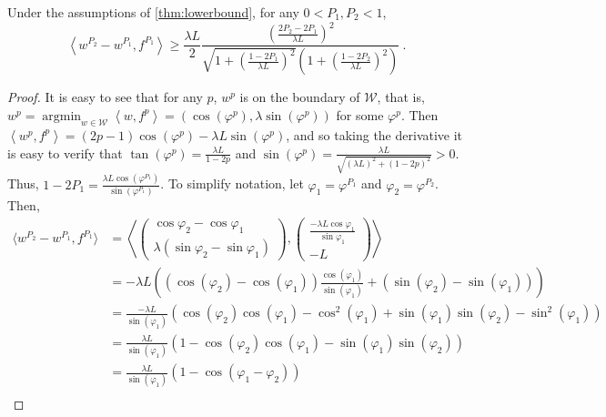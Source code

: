 \documentclass[english]{article}
\newcommand{\cW}{\mathcal{W}}
\newcommand{\inner}[1]{\left\langle#1\right\rangle}
\DeclareMathOperator*{\argmin}{argmin}
\begin{document}
\begin{lemma} Under the assumptions of \cref{thm:lowerbound}, for any $0<P_1,P_2<1$,
	\label{lem:P2P1loss}
	\[
	\inner{w^{P_2} - w^{P_1}, f^{P_1}} \ge \frac{\lambda L}{2} \frac{\left( \frac{2P_2 - 2P_1}{\lambda L} \right)^2}{\sqrt{1+\left( \frac{1-2P_1}{\lambda L}\right)^2 } \left(1+\left( \frac{1-2P_2}{\lambda L}\right)^2 \right)}~.
	\]
\end{lemma}
\begin{proof}
	It is easy to see that for any $p$, $w^p$ is on the boundary of $\cW$, that is, $w^p = \argmin_{w\in\cW} \inner{ w, f^p } = (\cos (\varphi^p), \lambda\sin (\varphi^p))$ for some $\varphi^p$. 
	Then $\inner{w^p,f^p}= (2p-1) \cos (\varphi^p) - \lambda L \sin (\varphi^p)$, and so taking the derivative it is easy to verify that $\tan(\varphi^p) = \frac{\lambda L}{1-2p}$ and $\sin(\varphi^p) = \frac{\lambda L}{\sqrt{(\lambda L)^2+(1-2p)^2}} >0$. 
	Thus, $1-2P_1 = \frac{\lambda L\cos (\varphi^{P_1})}{\sin (\varphi^{P_1})}$. To simplify notation, let $\varphi_1=\varphi^{P_1}$ and $\varphi_2=\varphi^{P_2}$. Then,
	\allowdisplaybreaks
	\begin{align}
	\langle w^{P_2} - w^{P_1}, f^{P_1} \rangle & = \left\langle \left(
	\begin{array}{c}
	\cos \varphi_{2} - \cos \varphi_{1} \\
	\lambda \left(\sin \varphi_{2} - \sin \varphi_{1} \right) 
	\end{array}
	\right),  \left( 
	\begin{array}{c}
	\frac{-\lambda L\cos \varphi_{1}}{\sin \varphi_{1}} \\
	-L
	\end{array}
	\right) \right\rangle \nonumber \\ 
	& = -\lambda L\left( \left( \cos (\varphi_{2}) - \cos (\varphi_{1} ) \right) \frac{\cos (\varphi_{1})}{\sin( \varphi_{1})} 
		 + \left(\sin (\varphi_{2}) - \sin (\varphi_{1} )\right)  \right)  \nonumber \\
	& = \frac{-\lambda L}{\sin( \varphi_{1})} \left( \cos (\varphi_{2} )\cos (\varphi_{1} )- \cos^2(\varphi_{1} )+ \sin (\varphi_{1}) \sin (\varphi_{2}) - \sin^2(\varphi_{1}) \right)  \nonumber \\
	& = \frac{\lambda L}{\sin (\varphi_{1})} \left( 1- \cos (\varphi_{2}) \cos (\varphi_{1})  - \sin (\varphi_{1}) \sin (\varphi_{2}) \right) \nonumber \\
	& = \frac{\lambda L}{\sin (\varphi_{1})} \left( 1- \cos(\varphi_{1}-\varphi_{2}) \right) \nonumber \\

\end{align}
\end{proof}
\end{document}
